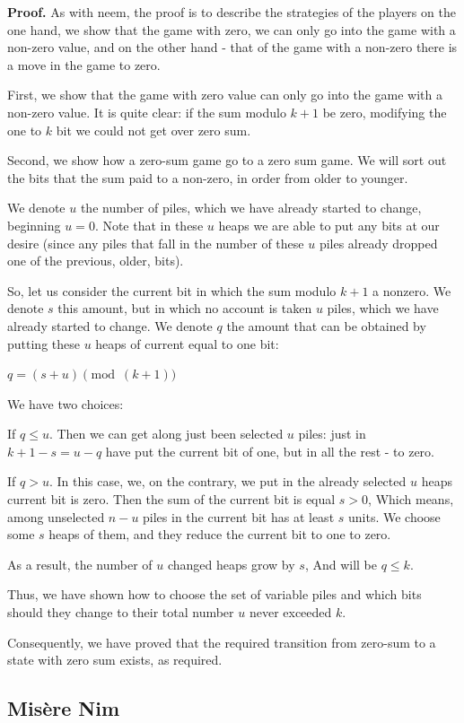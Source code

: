 \textbf{Proof.} As with neem, the proof is to describe the strategies of the players on the one hand, we show that the game with zero, we can only go into the game with a non-zero value, and on the other hand - that of the game with a non-zero there is a move in the game to zero.

First, we show that the game with zero value can only go into the game with a non-zero value. It is quite clear: if the sum modulo $k +1$ be zero, modifying the one to $k$ bit we could not get over zero sum.

Second, we show how a zero-sum game go to a zero sum game. We will sort out the bits that the sum paid to a non-zero, in order from older to younger.

We denote $u$ the number of piles, which we have already started to change, beginning $u = 0$. Note that in these $u$ heaps we are able to put any bits at our desire (since any piles that fall in the number of these $u$ piles already dropped one of the previous, older, bits).

So, let us consider the current bit in which the sum modulo $k +1$ a nonzero. We denote $s$ this amount, but in which no account is taken $u$ piles, which we have already started to change. We denote $q$ the amount that can be obtained by putting these $u$ heaps of current equal to one bit:

$q = (s + u) \pmod {(k +1)}$

We have two choices:

If $q \le u$.
Then we can get along just been selected $u$ piles: just in $k +1- s = u-q$ have put the current bit of one, but in all the rest - to zero.

If $q> u$.
In this case, we, on the contrary, we put in the already selected $u$ heaps current bit is zero. Then the sum of the current bit is equal $s> 0$, Which means, among unselected $n-u$ piles in the current bit has at least $s$ units. We choose some $s$ heaps of them, and they reduce the current bit to one to zero.

As a result, the number of $u$ changed heaps grow by $s$, And will be $q \le k$.

Thus, we have shown how to choose the set of variable piles and which bits should they change to their total number $u$ never exceeded $k$.

Consequently, we have proved that the required transition from zero-sum to a state with zero sum exists, as required.

\subsection{ Misère Nim }

